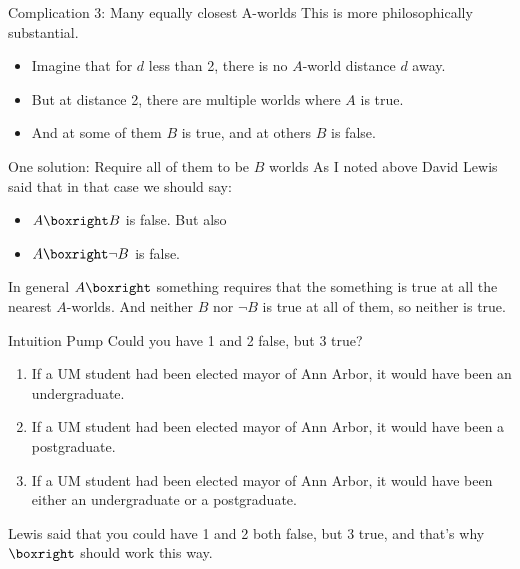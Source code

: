 \documentclass[
  ignorenonframetext,
]{beamer}
\providecommand{\tightlist}{%
  \setlength{\itemsep}{0pt}\setlength{\parskip}{0pt}}
\renewcommand{\,}{\text{, }}
\begin{document}
\begin{frame}{Complication 3: Many equally closest A-worlds}
\protect\hypertarget{complication-3-many-equally-closest-a-worlds}{}
This is more philosophically substantial.

\begin{itemize}
\tightlist
\item
  Imagine that for \(d\) less than 2, there is no \(A\)-world distance
  \(d\) away.
\item
  But at distance 2, there are multiple worlds where \(A\) is true.
\item
  And at some of them \(B\) is true, and at others \(B\) is false.
\end{itemize}
\end{frame}

\begin{frame}{One solution: Require all of them to be \(B\) worlds}
\protect\hypertarget{one-solution-require-all-of-them-to-be-b-worlds}{}
As I noted above David Lewis said that in that case we should say:

\begin{itemize}
\tightlist
\item
  \(A \boxright B\) is false. \pause  But also
\item
  \(A \boxright \neg B\) is false.
\end{itemize}

In general \(A \boxright\) something requires that the something is true
at all the nearest \(A\)-worlds. And neither \(B\) nor \(\neg B\) is
true at all of them, so neither is true.
\end{frame}

\begin{frame}{Intuition Pump}
\protect\hypertarget{intuition-pump}{}
Could you have 1 and 2 false, but 3 true?

\begin{enumerate}
\tightlist
\item
  If a UM student had been elected mayor of Ann Arbor, it would have
  been an undergraduate.
\item
  If a UM student had been elected mayor of Ann Arbor, it would have
  been a postgraduate.
\item
  If a UM student had been elected mayor of Ann Arbor, it would have
  been either an undergraduate or a postgraduate.
\end{enumerate}

Lewis said that you could have 1 and 2 both false, but 3 true, and
that's why \(\boxright\) should work this way.
\end{frame}
\end{document}
